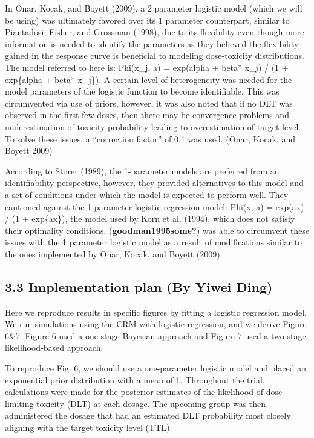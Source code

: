 \documentclass[
]{article}
\begin{document}
In Onar, Kocak, and Boyett (2009), a 2 parameter logistic model (which
we will be using) was ultimately favored over its 1 parameter
counterpart, similar to Piantadosi, Fisher, and Grossman (1998), due to
its flexibility even though more information is needed to identify the
parameters as they believed the flexibility gained in the response curve
is beneficial to modeling dose-toxicity distributions. The model
referred to here is: Phi(x\_j, a) = exp(alpha + beta* x\_j) / (1 +
exp\{alpha + beta* x\_j\}). A certain level of heterogeneity was needed
for the model parameters of the logistic function to become
identifiable. This was circumvented via use of priors, however, it was
also noted that if no DLT was observed in the first few doses, then
there may be convergence problems and underestimation of toxicity
probability leading to overestimation of target level. To solve these
issues, a ``correction factor'' of 0.1 was used. (Onar, Kocak, and
Boyett 2009)

According to Storer (1989), the 1-parameter models are preferred from an
identifiability perspective, however, they provided alternatives to this
model and a set of conditions under which the model is expected to
perform well. They cautioned against the 1 parameter logistic regression
model: Phi(x, a) = exp(ax) / (1 + exp\{ax\}), the model used by Korn et
al. (1994), which does not satisfy their optimality conditions.
(\textbf{goodman1995some?}) was able to circumvent these issues with the
1 parameter logistic model as a result of modifications similar to the
ones implemented by Onar, Kocak, and Boyett (2009).

\hypertarget{implementation-plan-by-yiwei-ding}{%
\subsection{3.3 Implementation plan (By Yiwei
Ding)}\label{implementation-plan-by-yiwei-ding}}

Here we reproduce results in specific figures by fitting a logistic
regression model. We run simulations using the CRM with logistic
regression, and we derive Figure 6\&7. Figure 6 used a one-stage
Bayesian approach and Figure 7 used a two-stage likelihood-based
approach.

To reproduce Fig. 6, we should use a one-parameter logistic model and
placed an exponential prior distribution with a mean of 1. Throughout
the trial, calculations were made for the posterior estimates of the
likelihood of dose-limiting toxicity (DLT) at each dosage. The upcoming
group was then administered the dosage that had an estimated DLT
probability most closely aligning with the target toxicity level (TTL).
\end{document}

